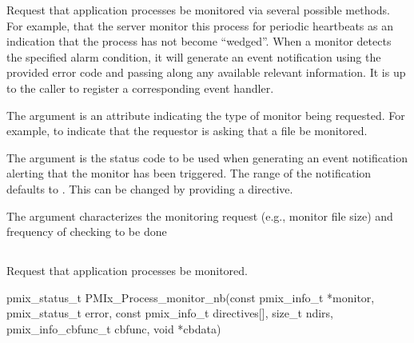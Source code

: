 \optattrend

\descr

Request that application processes be monitored via several possible methods.
For example, that the server monitor this process for periodic heartbeats as an indication that the process has not become ``wedged''.
When a monitor detects the specified alarm condition, it will generate an event notification using the provided error code and passing along any available relevant information.
It is up to the caller to register a corresponding event handler.

The  argument is an attribute indicating the type of monitor being requested.
For example,  to indicate that the requestor is asking that a file be monitored.

The  argument is the status code to be used when generating an event notification alerting that the monitor has been triggered.
The range of the notification defaults to .
This can be changed by providing a  directive.

The  argument characterizes the monitoring request (e.g., monitor file size) and frequency of checking to be done


\subsection{}

\summary

Request that application processes be monitored.

\format

\cspecificstart
\begin{codepar}
pmix_status_t
PMIx_Process_monitor_nb(const pmix_info_t *monitor, pmix_status_t error,
                        const pmix_info_t directives[], size_t ndirs,
                        pmix_info_cbfunc_t cbfunc, void *cbdata)
\end{codepar}
\cspecificend

\begin{arglist}
\end{arglist}

